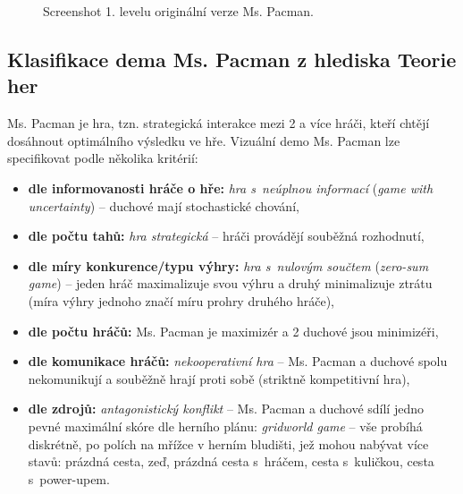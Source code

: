 \begin{figure}[!htbp]
\begin{center}
  \caption{Screenshot 1. levelu originální verze Ms. Pacman.}
  \label{img:mspac}
\end{center}
\end{figure}

\subsection*{Klasifikace dema Ms. Pacman z hlediska Teorie her}
Ms. Pacman je hra, tzn. strategická interakce mezi 2 a více hráči, kteří chtějí dosáhnout optimálního výsledku ve hře.
Vizuální demo Ms. Pacman lze specifikovat podle několika kritérií:
\begin{itemize}
  \item \textbf{dle informovanosti hráče o hře:} \textit{hra s neúplnou informací} (\textit{game with uncertainty}) -- duchové mají stochastické chování,
  \item \textbf{dle počtu tahů:} \textit{hra strategická} – hráči provádějí souběžná rozhodnutí,
  \item \textbf{dle míry konkurence/typu výhry:} \textit{hra s nulovým součtem} (\textit{zero-sum game})  -- jeden hráč maximalizuje svou výhru a druhý minimalizuje ztrátu (míra výhry jednoho značí míru prohry druhého hráče),
  \item \textbf{dle počtu hráčů:} Ms. Pacman je maximizér a 2 duchové jsou minimizéři,
  \item \textbf{dle komunikace hráčů:} \textit{nekooperativní hra} – Ms. Pacman a duchové spolu nekomunikují a souběžně hrají proti sobě (striktně kompetitivní hra),
  \item \textbf{dle zdrojů:} \textit{antagonistický konflikt} – Ms. Pacman a duchové sdílí jedno pevné maximální skóre dle herního plánu: \textit{gridworld game} – vše probíhá diskrétně, po polích na mřížce v herním bludišti, jež mohou nabývat více stavů: prázdná cesta, zeď, prázdná cesta s hráčem, cesta s kuličkou, cesta s power-upem.
\end{itemize}

